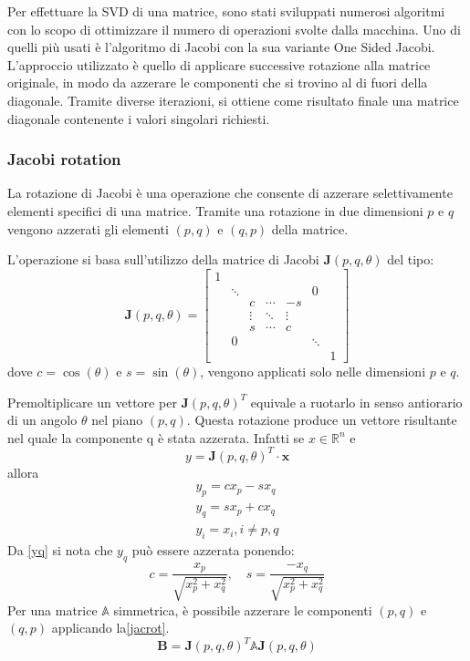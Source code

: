 Per effettuare la SVD di una matrice, sono stati sviluppati numerosi algoritmi con lo scopo di ottimizzare il numero di operazioni svolte dalla macchina.
Uno di quelli più usati è l'algoritmo di Jacobi con la sua variante One Sided Jacobi. L'approccio utilizzato è quello di applicare successive rotazione alla matrice originale, in modo da azzerare le componenti che si trovino al di fuori della diagonale. Tramite diverse iterazioni, si ottiene come risultato finale una matrice diagonale contenente i valori singolari richiesti.
\subsubsection{Jacobi rotation}
La rotazione di Jacobi è una operazione che consente di azzerare selettivamente elementi specifici di una matrice. Tramite una rotazione in due dimensioni $p$ e $q$ vengono azzerati gli elementi $(p,q)$ e $(q,p)$ della matrice.

L'operazione si basa sull'utilizzo della matrice di Jacobi $\mathbf{J}(p,q,\theta)$ del tipo:
\begin{equation}
\mathbf{J}(p,q,\theta)=\begin{bmatrix}
1 &  &  &  &  &  & \\
& \ddots &  &  &  & 0 & \\
&  & c & \cdots & -s &  & \\
&  & \vdots & \ddots & \vdots &  & \\
&  & s & \cdots & c &  & \\
& 0 &  &  &  & \ddots & \\
&  &  &  &  &  & 1
\end{bmatrix}
\end{equation}
dove $c=\cos(\theta)$ e $s=\sin(\theta)$, vengono applicati solo nelle dimensioni $p$ e $q$.

Premoltiplicare un vettore per $\mathbf{J}(p,q,\theta)^T$ equivale a ruotarlo in senso antiorario di un angolo $\theta$ nel piano $(p,q)$. Questa rotazione produce un vettore risultante nel quale la componente q è stata azzerata. Infatti se $x\in\mathbb{R}^{n}$ e
\begin{equation}
y=\mathbf{J}(p,q,\theta)^T	\cdot \mathbf{x}
\end{equation}
allora
\begin{eqnarray}
y_p=cx_p-sx_q\\
y_q=sx_p+cx_q\label{yq}\\
y_i=x_i, i\neq p,q
\end{eqnarray}
Da \eqref{yq} si nota che $y_q$ può essere azzerata ponendo:
\begin{equation}
c=\frac{x_p}{\sqrt{x_p^2+x_q^2}},\quad s=\frac{-x_q}{\sqrt{x_p^2+x_q^2}}
\end{equation}
Per una matrice $\mathbb{A}$ simmetrica, è possibile azzerare le componenti $(p,q)$ e $(q,p)$ applicando la\eqref{jacrot}.
\begin{equation}\label{jacrot}
\mathbf{B}=\mathbf{J}(p,q,\theta)^T\mathbb{A}\mathbf{J}(p,q,\theta)
\end{equation}

